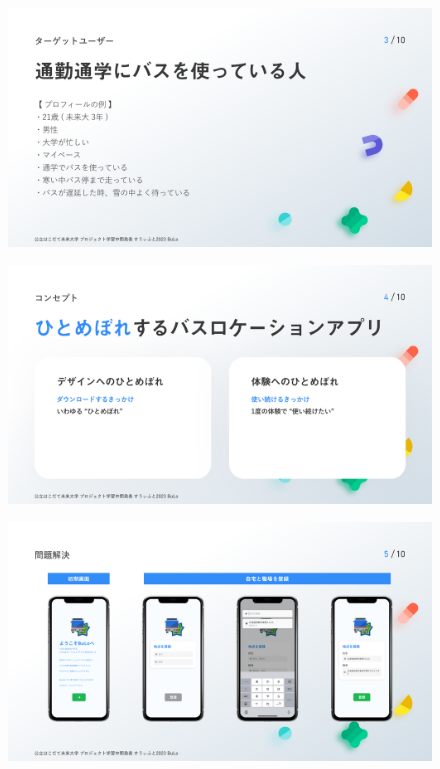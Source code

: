 \begin{figure}[htbp]
    \includegraphics[width=14cm]{images/slide3.png}
    \label{fig:slide3}
\end{figure}
\begin{figure}[htbp]
    \includegraphics[width=14cm]{images/slide4.png}
    \label{fig:slide4}
\end{figure}
\begin{figure}[htbp]
    \includegraphics[width=14cm]{images/slide5.png}
    \label{fig:slide5}
\end{figure}
